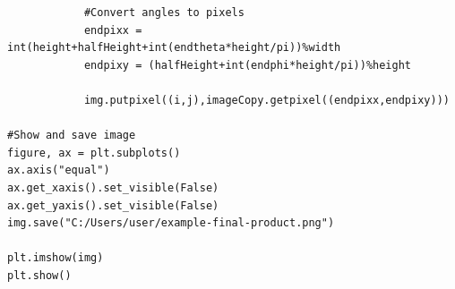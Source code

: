 \documentclass[oneside,openright,frontopenright, singlespacing]{dmathesis}
\begin{document}
\begin{lstlisting}
            #Convert angles to pixels
            endpixx = int(height+halfHeight+int(endtheta*height/pi))%width
            endpixy = (halfHeight+int(endphi*height/pi))%height

            img.putpixel((i,j),imageCopy.getpixel((endpixx,endpixy)))
            
#Show and save image
figure, ax = plt.subplots()
ax.axis("equal")
ax.get_xaxis().set_visible(False)
ax.get_yaxis().set_visible(False)
img.save("C:/Users/user/example-final-product.png")        

plt.imshow(img)
plt.show()
\end{lstlisting}






{}
\end{document}
